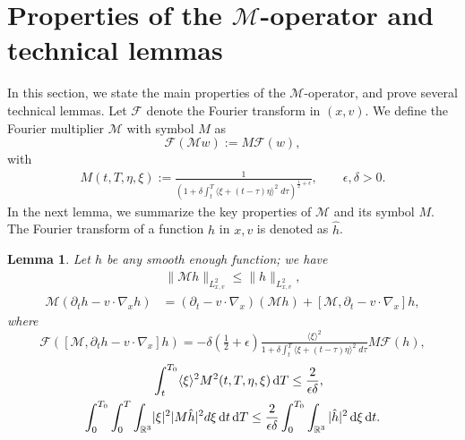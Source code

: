\documentclass[11pt,american, reqno]{amsart}
\numberwithin{equation}{section}
\newtheorem{lemma}[theorem]{Lemma}
\newcommand{\R}{\mathbb R}
\newcommand{\1}{\mathds{1}}
\newcommand{\dt}{\, {\rm d} t}
\newcommand{\dT}{\, {\rm d} T}
\newcommand{\CalM}{\mathcal{M}}
\newcommand{\dxi}{\, {\rm d} \xi}
\newcommand{\vpran}[1]{\left(#1\right)}
\newcommand{\Eps}{\epsilon}
\numberwithin{equation}{section}
\begin{document}
\section{Properties of the $\CalM$-operator and technical lemmas} \label{Sec:M-operator}
In this section, we state the main properties of the $\CalM$-operator, and  prove several technical lemmas. Let $\mathcal{F}$ denote the Fourier transform in $(x, v)$. We define the Fourier multiplier $\CalM$ with symbol ${M}$ as %
$$
{\mathcal{F}}({\mathcal{M}} w):= {M} {\mathcal{F}}(w) ,
$$
with   
\begin{align*} %
{M}(t,T, \eta,\xi) := \frac{1}{\left( 1 + \delta \int_t ^T \langle \xi +(t- \tau) \eta\rangle^{2} \;d\tau\right)^{\frac{1}{2}+ \Eps}},
\qquad 
\Eps, \delta > 0.
\end{align*}
In the next lemma, we summarize the key properties of $\CalM$ and its symbol $M$. The Fourier transform of a function $h$ in $x, v$ is denoted as $\hat h$.
\begin{lemma} 
\label{lem:M-basic}
Let $h$ be any smooth enough function; we have  %
\begin{align*}
\| \CalM h\|_{L^2_{x,v}} \le \|h\|_{L^2_{x,v}},
\end{align*}
\begin{align}
{\CalM} (\partial_t  h   -v \cdot \nabla_x   h)  
& = \vpran{\partial_t - v \cdot \nabla_x } ({\CalM} h) + [\CalM, \partial_t - v \cdot \nabla_x ]h,\label{trasp_comm}
\end{align}
where 
$$
\mathcal{F}([\CalM, \partial_t  h   -v \cdot \nabla_x ]h) = - \delta \left(\tfrac{1}{2}+ \Eps\right)\tfrac{\langle \xi \rangle^{2}}{1 + \delta \int_t ^T \langle \xi +(t- \tau) \eta\rangle^{2} \;d\tau} {M}\mathcal{F}({h}), 
$$  
\begin{align}
 & \int_t^{T_0}  \langle \xi \rangle ^2 {M}^2(t,T, \eta,\xi)  \dT 
\le    
 \frac{2}{\Eps \delta}, \label{int_xi_M2}
\\
 \int_0^{T_0}  \int_0^{T}  \int_{\R^3}  &|\xi|^2 | {M} \hat{h}| ^2d\xi  \dt \dT \le \frac{2}{\Eps \delta} \int_0^{T_0} \int_{\R^3} | \hat{h} |^2  \dxi \dt.  \label{lapl}
\end{align}
\end{lemma} 
\end{document}
